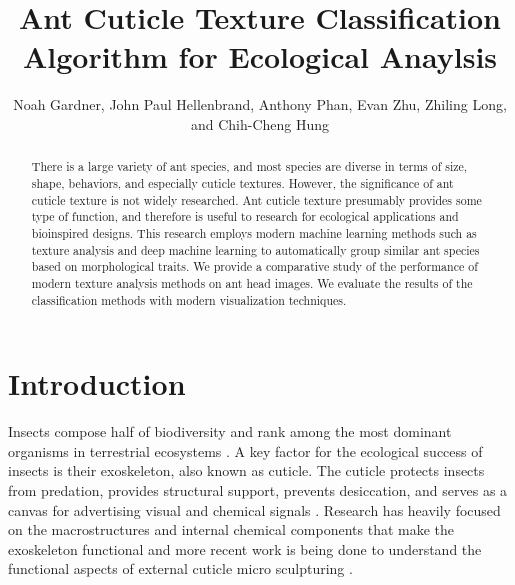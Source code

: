 \documentclass{aci}
\numberwithin{equation}{section}
\begin{document}
\title{Ant Cuticle Texture Classification Algorithm for Ecological Anaylsis}

\author{%
    Noah Gardner,
    John Paul Hellenbrand,
    Anthony Phan,
    Evan Zhu,
    Zhiling Long,
    and Chih-Cheng Hung\corrauth
}%


\address{%
}


\begin{abstract}
    There is a large variety of ant species, and most species are diverse in
    terms of size, shape, behaviors, and especially cuticle textures. However,
    the significance of ant cuticle texture is not widely researched. Ant
    cuticle texture presumably provides some type of function, and therefore is
    useful to research for ecological applications and bioinspired designs. This
    research employs modern machine learning methods such as texture analysis
    and deep machine learning to automatically group similar ant species based
    on morphological traits. We provide a comparative study of the performance
    of modern texture analysis methods on ant head images. We evaluate the
    results of the classification methods with modern visualization techniques.
\end{abstract}
\maketitle

\section{Introduction}
Insects compose half of biodiversity and rank among the most dominant organisms
in terrestrial ecosystems \cite{sheikh_diverse_2017}. A key factor for the
ecological success of insects is their exoskeleton, also known as cuticle. The
cuticle protects insects from predation, provides structural support, prevents
desiccation, and serves as a canvas for advertising visual and chemical signals
\cite{gullan_insects_2009}. Research has heavily focused on the macrostructures
and internal chemical components that make the exoskeleton functional and more
recent work is being done to understand the functional aspects of external
cuticle micro sculpturing \cite{muthukrishnan_insect_2020,
    gunderson_insect_1989, watson_diversity_2017}.
\end{document}
